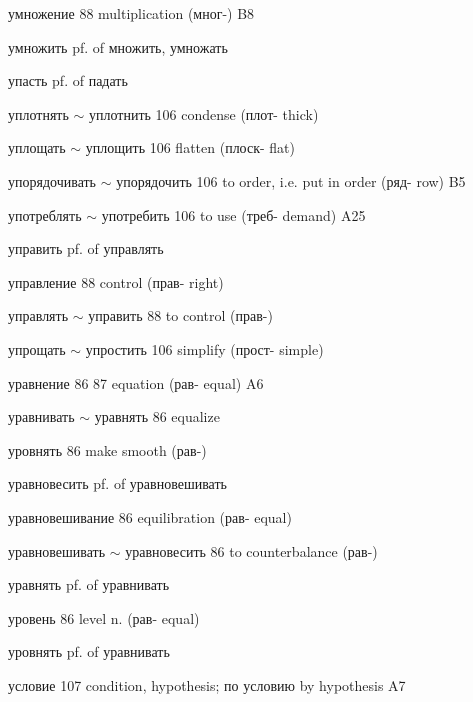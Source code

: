 \clearpage
\thispagestyle{plain}
\thispagestyle{plain}
\begingroup
\cyrillicfont
\fontsize{7.25}{8.25}\selectfont
\setlength{\parindent}{0pt}
\setlength{\parskip}{0pt}
\setlength{\emergencystretch}{1.5em}
\noindent
\begin{minipage}[t]{0.475\textwidth}
\raggedright
\noindent умножение 88 multiplication (мног-) B8\par
\noindent умножить pf. of множить, умножать\par
\noindent упасть pf. of падать\par
\noindent уплотнять $\sim$ уплотнить 106 condense (плот- thick)\par
\noindent уплощать $\sim$ уплощить 106 flatten (плоск- flat)\par
\noindent упорядочивать $\sim$ упорядочить 106 to order, i.e. put in order (ряд- row) B5\par
\noindent употреблять $\sim$ употребить 106 to use (треб- demand) A25\par
\noindent управить pf. of управлять\par
\noindent управление 88 control (прав- right)\par
\noindent управлять $\sim$ управить 88 to control (прав-)\par
\noindent упрощать $\sim$ упростить 106 simplify (прост- simple)\par
\noindent уравнение 86 87 equation (рав- equal) A6\par
\noindent уравнивать $\sim$ уравнять 86 equalize\par
\noindent уровнять 86 make smooth (рав-)\par
\noindent уравновесить pf. of уравновешивать\par
\noindent уравновешивание 86 equilibration (рав- equal)\par
\noindent уравновешивать $\sim$ уравновесить 86 to counterbalance (рав-)\par
\noindent уравнять pf. of уравнивать\par
\noindent уровень 86 level n. (рав- equal)\par
\noindent уровнять pf. of уравнивать\par
\noindent условие 107 condition, hypothesis; по условию by hypothesis A7\par
\end{minipage}\hfill
